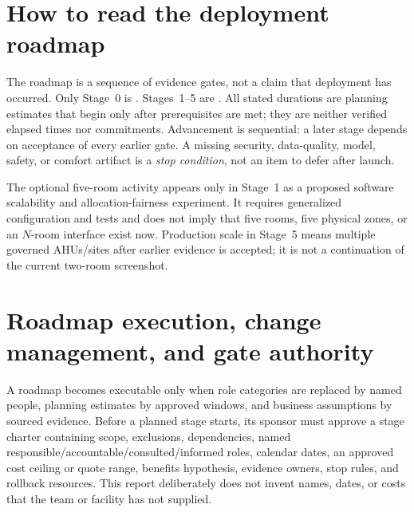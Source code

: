 \section{How to read the deployment roadmap}
\label{sec:roadmap-reading}
The roadmap is a sequence of evidence gates, not a claim that deployment has occurred. Only Stage~0 is \current. Stages~1--5 are \planned. All stated durations are planning estimates that begin only after prerequisites are met; they are neither verified elapsed times nor commitments. Advancement is sequential: a later stage depends on acceptance of every earlier gate. A missing security, data-quality, model, safety, or comfort artifact is a \emph{stop condition}, not an item to defer after launch.

The optional five-room activity appears only in Stage~1 as a proposed software scalability and allocation-fairness experiment. It requires generalized configuration and tests and does not imply that five rooms, five physical zones, or an $N$-room interface exist now. Production scale in Stage~5 means multiple governed AHUs/sites after earlier evidence is accepted; it is not a continuation of the current two-room screenshot.

\section{Roadmap execution, change management, and gate authority}
A roadmap becomes executable only when role categories are replaced by named people, planning estimates by approved windows, and business assumptions by sourced evidence. Before a planned stage starts, its sponsor must approve a stage charter containing scope, exclusions, dependencies, named responsible/accountable/consulted/informed roles, calendar dates, an approved cost ceiling or quote range, benefits hypothesis, evidence owners, stop rules, and rollback resources. This report deliberately does not invent names, dates, or costs that the team or facility has not supplied.

